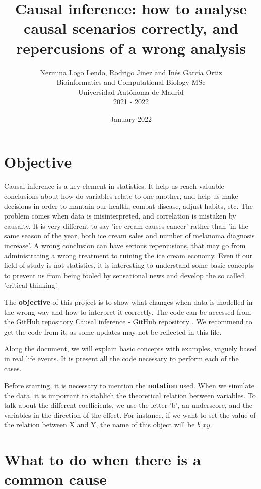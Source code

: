 \documentclass{article}
\title{Causal inference: how to analyse causal scenarios correctly, and repercusions of a wrong analysis}
\author{Nermina Logo Lendo, Rodrigo Jinez and Inés García Ortiz\\
      Bioinformatics and Computational Biology MSc\\
      Universidad Autónoma de Madrid\\
      2021 - 2022}
\date{January 2022}
\begin{document}
\maketitle
\tableofcontents
\newpage
\section{Objective}

Causal inference is a key element in statistics. It help us reach valuable conclusions about how do variables relate to one another, and help us make decisions in order to mantain our health, combat disease, adjust habits, etc. The problem comes when data is misinterpreted, and correlation is mistaken by causalty. It is very different to say 'ice cream causes cancer' rather than 'in the same season of the year, both ice cream sales and number of melanoma diagnosis increase'. A wrong conclusion can have serious repercusions, that may go from administrating a wrong treatment to ruining the ice cream economy. Even if our field of study is not statistics, it is interesting to understand some basic concepts to prevent us from being fooled by sensational news and develop the so called 'critical thinking'. \par
The \textbf{objective} of this project is to show what changes when data is modelled in the wrong way and how to interpret it correctly. The code can be accessed from the GitHub repository \href{https://github.com/igarcia17/causal_inference}{Causal inference - GitHub repository} . We recommend to get the code from it, as some updates may not be reflected in this file.\par
Along the document, we will explain basic concepts with examples, vaguely based in real life events. It is present all the code necessary to perform each of the cases.\par
Before starting, it is necessary to mention the \textbf{notation} used. When we simulate the data, it is important to stablich the theoretical relation between variables. To talk about the different coefficients, we use the letter 'b', an underscore, and the variables in the direction of the effect. For instance, if we want to set the value of the relation between X and Y, the name of this object will be \(b\_xy\).

\newpage

\section{What to do when there is a common cause}
\end{document}
